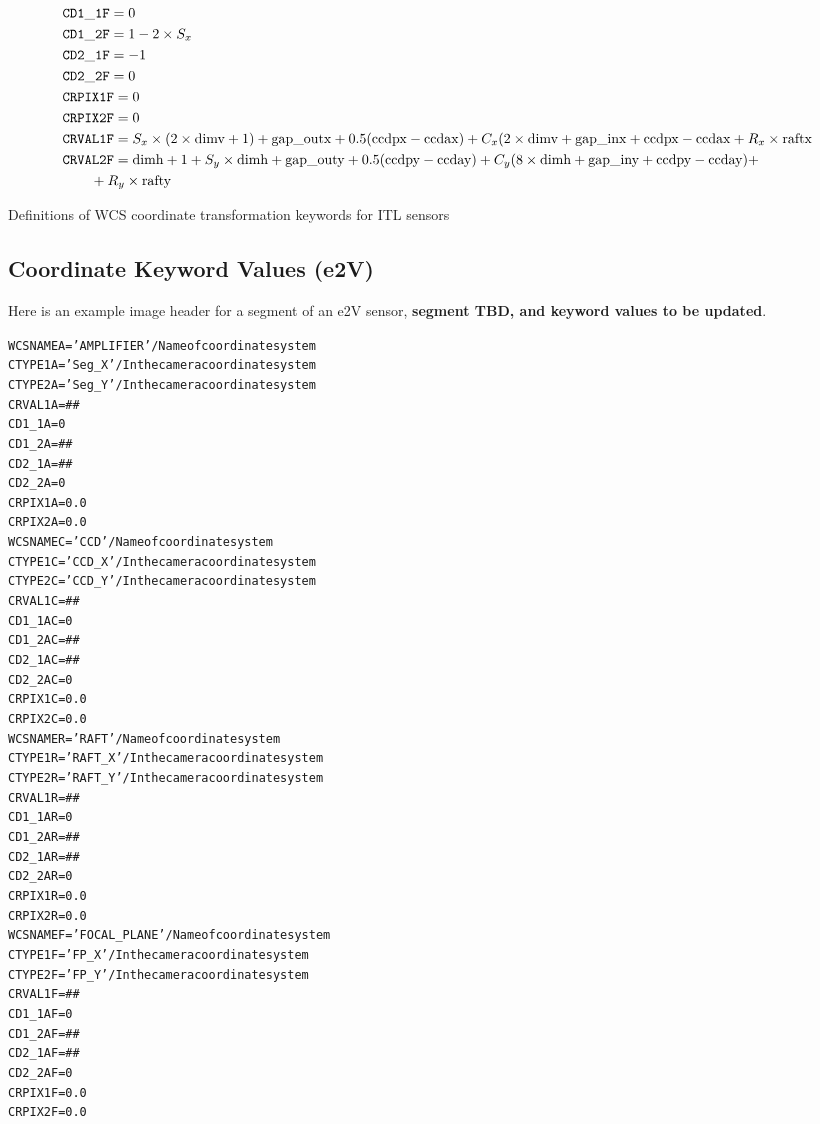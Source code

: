 \documentclass{article}[12pt]
\begin{document}
\begin{table}
\begin{align*}
& {\tt CD1\_1F} = 0 \\
& {\tt CD1\_2F} = 1 - 2 \times S_x \\
& {\tt CD2\_1F} = -1 \\
& {\tt CD2\_2F} = 0 \\
& {\tt CRPIX1F} = 0 \\
& {\tt CRPIX2F} = 0 \\
& {\tt CRVAL1F} = S_x \times(2 \times {\rm dimv} + 1) + {\rm gap\_outx} + 0.5({\rm ccdpx} - {\rm ccdax}) + C_x(2 \times {\rm dimv} + {\rm gap\_inx} + {\rm ccdpx} - {\rm ccdax} + R_x \times {\rm raftx} \\
& {\tt CRVAL2F} = {\rm dimh} + 1 + S_y \times {\rm dimh} + {\rm gap\_outy} + 0.5({\rm ccdpy} - {\rm ccday}) +  C_y ( 8 \times {\rm dimh} + {\rm gap\_iny} + {\rm ccdpy} - {\rm ccday}) + \\  &\qquad {} + R_y \times {\rm rafty} \\
\end{align*}
\caption{Definitions of WCS coordinate transformation keywords for ITL sensors\label{tab:itlwcs}}
\end{table}



\subsection{Coordinate Keyword Values (e2V)\label{sec:coords_ifl}}

Here is an example image header for a segment of an e2V sensor, {\bf segment TBD, and keyword values to be updated}.  

\begin{alltt}
WCSNAMEA= 'AMPLIFIER'          / Name of coordinate system
CTYPE1A = 'Seg_X   '           / In the camera coordinate system
CTYPE2A = 'Seg_Y   '           / In the camera coordinate system
CRVAL1A =                  ##
CD1_1A  =                    0
CD1_2A  =                   ##
CD2_1A  =                   ##
CD2_2A  =                    0
CRPIX1A =                  0.0
CRPIX2A =                  0.0
WCSNAMEC= 'CCD'                / Name of coordinate system
CTYPE1C = 'CCD_X   '           / In the camera coordinate system
CTYPE2C = 'CCD_Y   '           / In the camera coordinate system
CRVAL1C =                  ##
CD1_1AC =                   0
CD1_2AC =                  ##
CD2_1AC =                  ##
CD2_2AC =                   0
CRPIX1C =                 0.0
CRPIX2C =                 0.0
WCSNAMER= 'RAFT'               / Name of coordinate system
CTYPE1R = 'RAFT_X'             / In the camera coordinate system
CTYPE2R = 'RAFT_Y'             / In the camera coordinate system
CRVAL1R =                  ##
CD1_1AR =                   0
CD1_2AR =                  ##
CD2_1AR =                  ##
CD2_2AR =                   0
CRPIX1R =                  0.0
CRPIX2R =                  0.0
WCSNAMEF= 'FOCAL_PLANE'        / Name of coordinate system
CTYPE1F = 'FP_X'               / In the camera coordinate system
CTYPE2F = 'FP_Y'               / In the camera coordinate system
CRVAL1F =                  ##
CD1_1AF =                  0
CD1_2AF =                  ##
CD2_1AF =                  ##
CD2_2AF =                  0
CRPIX1F =                  0.0
CRPIX2F =                  0.0
\end{alltt}
\end{document}
